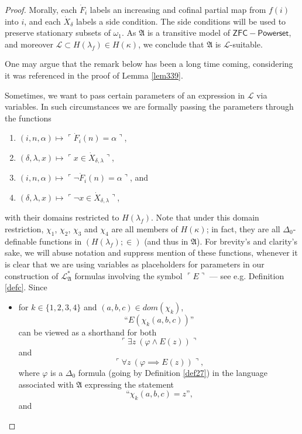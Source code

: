 \documentclass[12pt]{article}
\numberwithin{equation}{section}
\begin{document}
\begin{proof}
Morally, each $\dot{F}_i$ labels an increasing and cofinal partial map from $f(i)$ into $i$, and each $\dot{X}_{\delta}$ labels a side condition. The side conditions will be used to preserve stationary subsets of $\omega_1$. As 
$\mathfrak{A}$ is a transitive model of $\mathsf{ZFC - Powerset}$, and moreover $\mathcal{L} \subset H(\lambda_f) \in H(\kappa)$, we conclude that $\mathfrak{A}$ is $\mathcal{L}$-suitable.

One may argue that the remark below has been a long time coming, considering it was referenced in the proof of Lemma \ref{lem339}.

\begin{rem}\label{rempp}
Sometimes, we want to pass certain parameters of an expression in $\mathcal{L}$ via variables. In such circumstances we are formally passing the parameters through the functions
\begin{enumerate}[label=$\chi_{\arabic*} :$, leftmargin=45pt]
    \item $(i, n, \alpha) \mapsto \ulcorner \dot{F}_i (n) = \alpha \urcorner$,
    \item $(\delta, \lambda, x) \mapsto \ulcorner x \in \dot{X}_{\delta, \lambda} \urcorner$,
    \item $(i, n, \alpha) \mapsto \ulcorner \neg \dot{F}_i (n) = \alpha \urcorner$, and
    \item $(\delta, \lambda, x) \mapsto \ulcorner \neg x \in \dot{X}_{\delta, \lambda} \urcorner$,
\end{enumerate}
with their domains restricted to $H(\lambda_f)$. Note that under this domain restriction, $\chi_1$, $\chi_2$, $\chi_3$ and $\chi_4$ are all members of $H(\kappa)$; in fact, they are all $\Delta_0$-definable functions in $(H(\lambda_f); \in)$ (and thus in $\mathfrak{A}$). For brevity's and clarity's sake, we will abuse notation and suppress mention of these functions, whenever it is clear that we are using variables as placeholders for parameters in our construction of $\mathcal{L}^{*}_{\mathfrak{A}}$ formulas involving the symbol $\ulcorner E \urcorner$ --- see e.g. Definition \ref{defc}. Since 
\begin{itemize}
    \item for $k \in \{1, 2, 3, 4\}$ and $(a, b, c) \in dom(\chi_k)$, $$\text{``} E(\chi_k(a,b,c)) \text{''}$$ can be viewed as a shorthand for both $$\ulcorner \exists z \ (\varphi \wedge E(z)) \urcorner$$ and $$\ulcorner \forall z \ (\varphi \implies E(z)) \urcorner,$$ where $\varphi$ is a $\Delta_0$ formula (going by Definition \ref{def27}) in the language associated with $\mathfrak{A}$ expressing the statement $$\text{``} \chi_k(a, b, c) = z \text{'',}$$ and

\end{itemize}
\end{rem}
\end{proof}
\end{document}
